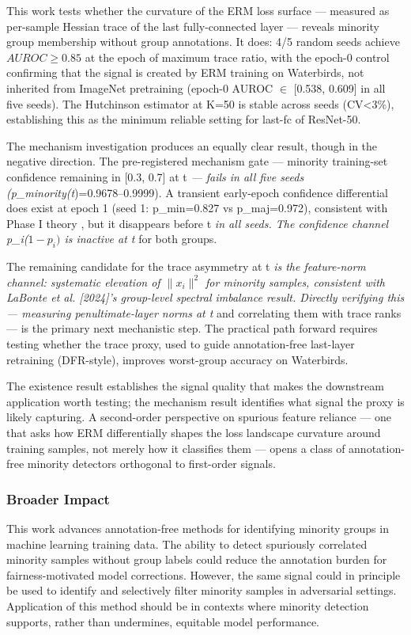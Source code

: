 
This work tests whether the curvature of the ERM loss surface --- measured as per-sample Hessian trace of the last fully-connected layer --- reveals minority group membership without group annotations. It does: 4/5 random seeds achieve $AUROC\geq 0.85$ at the epoch of maximum trace ratio, with the epoch-0 control confirming that the signal is created by ERM training on Waterbirds, not inherited from ImageNet pretraining (epoch-0 AUROC $\in$ [0.538, 0.609] in all five seeds). The Hutchinson estimator at K=50 is stable across seeds (CV<3\%), establishing this as the minimum reliable setting for last-fc of ResNet-50.

The mechanism investigation produces an equally clear result, though in the negative direction. The pre-registered mechanism gate --- minority training-set confidence remaining in [0.3, 0.7] at t\textit{ --- fails in all five seeds (p\_minority(t})=0.9678--0.9999). A transient early-epoch confidence differential does exist at epoch 1 (seed 1: p\_min=0.827 vs p\_maj=0.972), consistent with Phase I theory \citep{labonte2026phase}, but it disappears before t\textit{ in all seeds. The confidence channel p\_i($1-p_{i})$ is inactive at t} for both groups.

The remaining candidate for the trace asymmetry at t\textit{ is the feature-norm channel: systematic elevation of $\|x_{i}\|^2$ for minority samples, consistent with LaBonte et al. [2024]'s group-level spectral imbalance result. Directly verifying this --- measuring penultimate-layer norms at t} and correlating them with trace ranks --- is the primary next mechanistic step. The practical path forward requires testing whether the trace proxy, used to guide annotation-free last-layer retraining (DFR-style), improves worst-group accuracy on Waterbirds.

The existence result establishes the signal quality that makes the downstream application worth testing; the mechanism result identifies what signal the proxy is likely capturing. A second-order perspective on spurious feature reliance --- one that asks how ERM differentially shapes the loss landscape curvature around training samples, not merely how it classifies them --- opens a class of annotation-free minority detectors orthogonal to first-order signals.

\subsubsection{Broader Impact}

This work advances annotation-free methods for identifying minority groups in machine learning training data. The ability to detect spuriously correlated minority samples without group labels could reduce the annotation burden for fairness-motivated model corrections. However, the same signal could in principle be used to identify and selectively filter minority samples in adversarial settings. Application of this method should be in contexts where minority detection supports, rather than undermines, equitable model performance.
